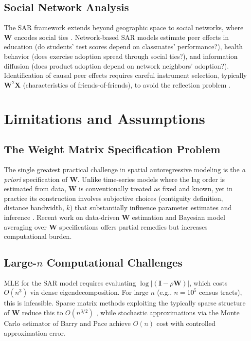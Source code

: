 \documentclass[conference]{IEEEtran}
\theoremstyle{definition}
\begin{document}
\subsection{Social Network Analysis}

The SAR framework extends beyond geographic space to social networks, where $\mathbf{W}$ encodes social ties \cite{bramoulle2009identification}. Network-based SAR models estimate peer effects in education (do students' test scores depend on classmates' performance?), health behavior (does exercise adoption spread through social ties?), and information diffusion (does product adoption depend on network neighbors' adoption?). Identification of causal peer effects requires careful instrument selection, typically $\mathbf{W}^2\mathbf{X}$ (characteristics of friends-of-friends), to avoid the reflection problem \cite{manski1993identification}.

\section{Limitations and Assumptions}
\label{sec:limits}

\subsection{The Weight Matrix Specification Problem}

The single greatest practical challenge in spatial autoregressive modeling is the \emph{a priori} specification of $\mathbf{W}$. Unlike time-series models where the lag order is estimated from data, $\mathbf{W}$ is conventionally treated as fixed and known, yet in practice its construction involves subjective choices (contiguity definition, distance bandwidth, $k$) that substantially influence parameter estimates and inference \cite{halleck2015w}. Recent work on data-driven $\mathbf{W}$ estimation \cite{bhatt2017improved} and Bayesian model averaging over $\mathbf{W}$ specifications offers partial remedies but increases computational burden.

\subsection{Large-$n$ Computational Challenges}

MLE for the SAR model requires evaluating $\log|(\mathbf{I} - \rho\mathbf{W})|$, which costs $O(n^3)$ via dense eigendecomposition. For large $n$ (e.g., $n = 10^5$ census tracts), this is infeasible. Sparse matrix methods exploiting the typically sparse structure of $\mathbf{W}$ reduce this to $O(n^{3/2})$ \cite{pace1997sparse}, while stochastic approximations via the Monte Carlo estimator of Barry and Pace \cite{barry1999monte} achieve $O(n)$ cost with controlled approximation error.
\end{document}
